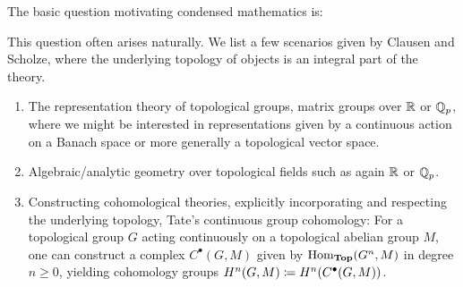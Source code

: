 The basic question motivating condensed mathematics is:
\begin{center}
\end{center}
This question often arises naturally. We list a few scenarios given by Clausen and Scholze, where the underlying topology of objects is an integral part of the theory.
\begin{enumerate}
	\item
	The representation theory of topological groups, \eg matrix groups over ${\mathbb{R}}$ or ${{\mathbb{Q}}_{p}}$, where we might be interested in representations given by a continuous action on a Banach space or more generally a topological vector space.
	
	\item 
	Algebraic/analytic geometry over topological fields such as again ${\mathbb{R}}$ or ${{\mathbb{Q}}_{p}}$.
	
	\item
	Constructing cohomological theories, explicitly incorporating and respecting the underlying topology, \eg Tate's continuous group cohomology:	For a topological group $G$ acting continuously on a topological abelian group $M$, one can construct a complex $C^\bullet(G, M)$ given by ${\operatorname{Hom}}_{{\mathbf{Top}}}(G^n, M)$ in degree $n\ge 0$, yielding cohomology groups $H^n(G, M) \coloneqq H^n(C^\bullet(G, M))$.
\end{enumerate}

